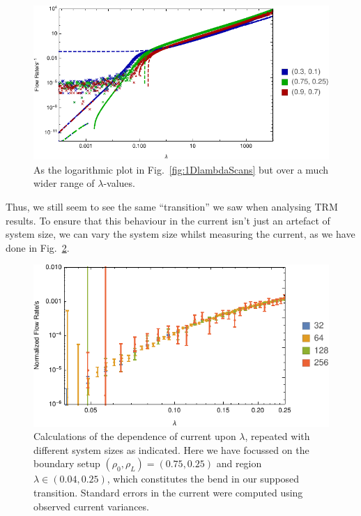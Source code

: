\begin{figure} \caption[As Fig.~\ref{fig:1DlambdaScans} but over a much wider range of $\lambda$-values.]{As the logarithmic plot in Fig.~\ref{fig:1DlambdaScans} but over a  much wider range of $\lambda$-values.} 
\label{fig:1DlambdaScansLogged}
\begin{center}
\includegraphics[width=1.0\textheight, angle=270]{numerics/images/lambdaScan/allDataWide}
\end{center}
\end{figure}

Thus, we still seem to see the same ``transition'' we saw when analysing TRM results. To ensure that this
behaviour in the current isn't just an artefact of system size, we can vary the system size whilst
measuring the current, as we have done in Fig.~\ref{fig:lambdaScanRepeats}.
\begin{figure} \caption[Calculations of the dependence of current upon $\lambda$, repeated with different system sizes.]{Calculations of the dependence of current upon $\lambda$, repeated with different system sizes as indicated. Here we have focussed on the boundary setup 
$(\rho_0, \rho_L) = (0.75, 0.25)$ and region $\lambda \in (0.04, 0.25)$, which constitutes the
bend in our supposed transition. Standard errors in the current were computed using observed current 
variances.} 
\label{fig:lambdaScanRepeats}
\begin{center}
\includegraphics[width=0.95\textheight, angle=270]{numerics/images/lambdaScan/lambdaScanRepeatFlows}
\end{center}
\end{figure}

